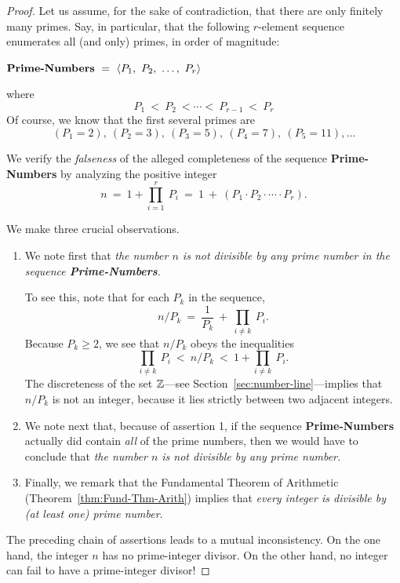 \begin{proof}
Let us assume, for the sake of contradiction, that there are only
finitely many primes.  Say, in particular, that the following
$r$-element sequence enumerates all (and only) primes, in order of
magnitude:

\noindent
$\mbox{\bf Prime-Numbers} \ = \ 
\langle P_1, \ P_2, \ \ldots, \ P_r \rangle$

\noindent where
\[ P_1 \ < \ P_2 \ < \cdots < \ P_{r-1} \ < \ P_r \]
Of course, we know that the first several primes are
\[ (P_1 =2), \ (P_2 = 3), \ (P_3 =5), \ (P_4 = 7), \ (P_5 =11), \ldots \] 

We verify the {\em falseness} of the alleged completeness of the sequence
{\bf Prime-Numbers} by analyzing the positive integer
\[ n \ = \ 1 + \prod_{i=1}^r \ P_i \ = \ 1 \ + \ 
\left(P_1 \cdot P_2 \cdot \cdots \cdot P_r \right).
\]

We make three crucial observations.

\begin{enumerate}
\item
We note first that {\em the number $n$ is not divisible by any prime
number  in the sequence {\bf Prime-Numbers}.}

To see this, note that for each $P_k$ in the sequence,
\[
n / P_k \ = \ \frac{1}{P_k} \ + \ \prod_{i \neq k} \ P_i .
\]
Because $P_k \geq 2$, we see that $n / P_k$ obeys the inequalities
\[
\prod_{i \neq k} \ P_i \ < \ n/P_k \ < \ 1 + \prod_{i \neq k} \ P_i.
\] 
The discreteness of the set $\mathbb{Z}$---see
Section~\ref{sec:number-line}---implies that $n / P_k$ is not an
integer, because it lies strictly between two adjacent integers.

\item
We note next that, because of assertion 1, if the sequence {\bf
  Prime-Numbers} actually did contain {\em all} of the prime numbers,
then we would have to conclude that {\em the number $n$ is not
  divisible by any prime number.}

\item
Finally, we remark that the Fundamental Theorem of Arithmetic
(Theorem~\ref{thm:Fund-Thm-Arith}) implies that {\em every integer is
  divisible by (at least one) prime number}.
\end{enumerate}
The preceding chain of assertions leads to a mutual inconsistency.  On
the one hand, the integer $n$ has no prime-integer divisor.  On the
other hand, no integer can fail to have a prime-integer divisor!


\end{proof}
